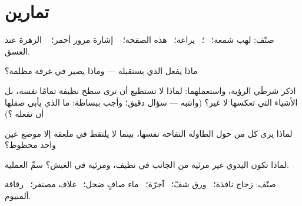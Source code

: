 \section{تمارين}

\begin{exercise}[$\star$]\label{exo:g7:light-sources-propagation:1}
صنّف: لهب شمعة؛ \ ؛ \ يراعة؛ \ هذه الصفحة؛ \  إشارة
مرور أحمر؛ \  الزهرة عند الغسق.
\end{exercise}

\begin{exercise}[$\star$]\label{exo:g7:light-sources-propagation:2}
ماذا يفعل   الذي يستقبله --- وماذا يصير في
غرفة مظلمة؟
\end{exercise}

\begin{exercise}[$\star$]\label{exo:g7:light-sources-propagation:3}
اذكر شرطَي الرؤية، واستعملهما: لماذا لا تستطيع أن ترى سطح
 نظيفة تمامًا \emph{نفسه}، بل الأشياء التي تعكسها لا غير؟
(وانتبه --- سؤال دقيق؛ وأجب ببساطة: ما الذي يأبى صقلها أن
تفعله ؟)
\end{exercise}

\begin{exercise}[$\star$]\label{exo:g7:light-sources-propagation:4}
لماذا يرى كل من حول الطاولة التفاحة نفسها، بينما لا يلتقط
  في ملعقة إلا موضع عين واحد محظوظ؟
\end{exercise}

\begin{exercise}[$\star$]\label{exo:g7:light-sources-propagation:5}
لماذا تكون   اليدوي غير مرئية من الجانب في 
نظيف، ومرئية في الغبش؟ سمِّ العملية.
\end{exercise}

\begin{exercise}[$\star$]\label{exo:g7:light-sources-propagation:6}
صنّف: زجاج نافذة؛ \ ورق شفّ؛ \ آجرّة؛ \ ماء صافٍ ضحل؛ \ غلاف
 مصنفر؛ \ رقاقة ألمنيوم.
\end{exercise}

